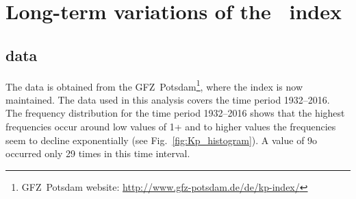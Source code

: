 \section{Long-term variations of the \Kp{}~index}
\label{sec:long_term_variations}

\subsection{\Kp{} data}
The \Kp{} data is obtained from the GFZ~Potsdam\footnote{GFZ~Potsdam website: \url{http://www.gfz-potsdam.de/de/kp-index/}}, where the index is now maintained. The data used in this analysis covers the time period 1932--2016.\\

The \Kp{} frequency distribution for the time period 1932--2016 shows that the highest frequencies occur around low \Kp{} values of 1+ and to higher \Kp{} values the frequencies seem to decline exponentially (see Fig.~\ref{fig:Kp_histogram}). A \Kp{} value of 9o occurred only 29 times in this time interval.\\
\begin{figure}
\end{figure}

